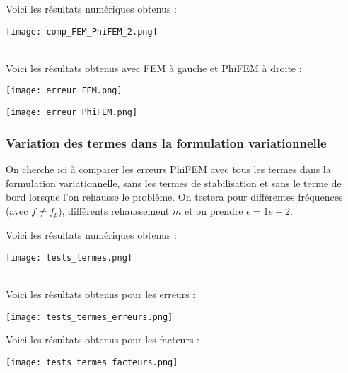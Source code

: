 Voici les résultats numériques obtenus :

\begin{minipage}{\linewidth}
	\centering
	\texttt{[image: comp\_FEM\_PhiFEM\_2.png]}
\end{minipage} \\

Voici les résultats obtenus avec FEM à gauche et PhiFEM à droite :

\begin{minipage}{0.48\linewidth}
	\centering
	\texttt{[image: erreur\_FEM.png]}
\end{minipage}
\begin{minipage}{0.48\linewidth}
	\centering
	\texttt{[image: erreur\_PhiFEM.png]}
\end{minipage}

\subsubsection*{Variation des termes dans la formulation variationnelle}

On cherche ici à comparer les erreurs PhiFEM avec tous les termes dans la formulation variationnelle, sans les termes de stabilisation et sans  le terme de bord lorsque l'on rehausse le problème. On testera pour différentes fréquences (avec $f\ne f_p$), différents rehaussement $m$ et on prendre $\epsilon=1e-2$.

Voici les résultats numériques obtenus :

\begin{minipage}{\linewidth}
	\centering
	\texttt{[image: tests\_termes.png]}
\end{minipage} \\

Voici les résultats obtenus pour les erreurs :

\begin{minipage}{\linewidth}
	\centering
	\texttt{[image: tests\_termes\_erreurs.png]}
\end{minipage}

Voici les résultats obtenus pour les facteurs :

\begin{minipage}{\linewidth}
	\centering
	\texttt{[image: tests\_termes\_facteurs.png]}
\end{minipage}